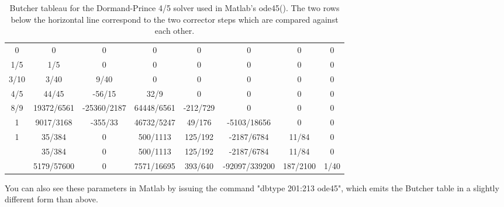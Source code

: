 \documentclass[hidelinks,notitlepage]{book}
\begin{document}
\begin{table}
\begin{center}
	\renewcommand{\arraystretch}{1.5}
	\begin{tabular}{  c|c c c c c c c } 
		0 & 0 & 0 & 0 & 0 & 0  & 0  & 0  \\ 
		1/5 & 1/5 & 0 & 0 & 0 & 0  & 0  & 0  \\ 
		3/10 & 3/40 & 9/40 & 0 & 0 & 0 & 0 & 0 \\ 
		4/5 & 44/45 & -56/15 & 32/9 & 0 & 0 & 0 & 0 \\ 
		8/9 & 19372/6561 & -25360/2187 & 64448/6561 & -212/729 & 0 & 0 & 0 \\
		1 & 9017/3168 & -355/33 & 46732/5247 & 49/176 & -5103/18656 & 0 & 0 \\
		1 & 35/384 & 0 & 500/1113 & 125/192 & -2187/6784 & 11/84 & 0 \\
		\hline
		& 35/384 & 0 & 500/1113 & 125/192 & -2187/6784 & 11/84 & 0 \\ 
		& 5179/57600 & 0 & 7571/16695 & 393/640 & -92097/339200 & 187/2100 & 1/40 \\ 
		
	\end{tabular}
\caption{Butcher tableau for the Dormand-Prince 4/5 solver used in Matlab's ode45().  The two rows below the horizontal line correspond to the two corrector steps which are compared against each other.}
\label{tab:DP45ButcherTableau1}
\end{center}
\end{table}
You can also see these parameters in Matlab by issuing the command "dbtype 201:213 ode45", which emits the Butcher table in a slightly different form than above.
% 
\end{document}
